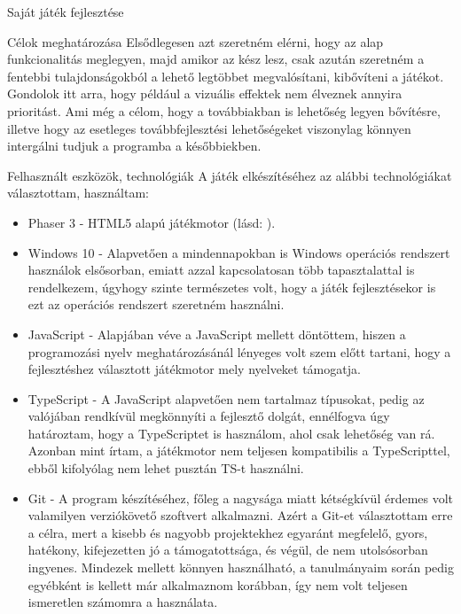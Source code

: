 \begin{MyChapter}{Saját játék fejlesztése}
\begin{MySection}{Célok meghatározása}
		Elsődlegesen azt szeretném elérni, hogy az alap funkcionalitás meglegyen, majd amikor az kész lesz, csak azután szeretném a fentebbi tulajdonságokból a lehető legtöbbet megvalósítani, kibővíteni a játékot. Gondolok itt arra, hogy például a vizuális effektek nem élveznek annyira prioritást. Ami még a célom, hogy a továbbiakban is lehetőség legyen bővítésre, illetve hogy az esetleges továbbfejlesztési lehetőségeket viszonylag könnyen intergálni tudjuk a programba a későbbiekben.
	\end{MySection}
		
	\begin{MySection}{Felhasznált eszközök, technológiák}
		A játék elkészítéséhez az alábbi technológiákat választottam, használtam:
		
		\begin{itemize}
			\item Phaser 3 - HTML5 alapú játékmotor (lásd: ).
			
			\item Windows 10 - Alapvetően a mindennapokban is Windows operációs rendszert használok elsősorban, emiatt azzal kapcsolatosan több tapasztalattal is rendelkezem, úgyhogy szinte természetes volt, hogy a játék fejlesztésekor is ezt az operációs rendszert szeretném használni.
			
			\item JavaScript - Alapjában véve a JavaScript mellett döntöttem, hiszen a programozási nyelv meghatározásánál lényeges volt szem előtt tartani, hogy a fejlesztéshez választott játékmotor mely nyelveket támogatja.
			
			\item TypeScript - A JavaScript alapvetően nem tartalmaz típusokat, pedig az valójában rendkívül megkönnyíti a fejlesztő dolgát, ennélfogva úgy határoztam, hogy a TypeScriptet is használom, ahol csak lehetőség van rá. Azonban mint írtam, a játékmotor nem teljesen kompatibilis a TypeScripttel, ebből kifolyólag nem lehet pusztán TS-t használni.
			
			\item Git - A program készítéséhez, főleg a nagysága miatt kétségkívül érdemes volt valamilyen verziókövető szoftvert alkalmazni. Azért a Git-et választottam erre a célra, mert a kisebb és nagyobb projektekhez egyaránt megfelelő, gyors, hatékony, kifejezetten jó a támogatottsága, és végül, de nem utolsósorban ingyenes. Mindezek mellett könnyen használható, a tanulmányaim során pedig egyébként is kellett már alkalmaznom korábban, így nem volt teljesen ismeretlen számomra a használata.
			

\end{itemize}
\end{MySection}
\end{MyChapter}
